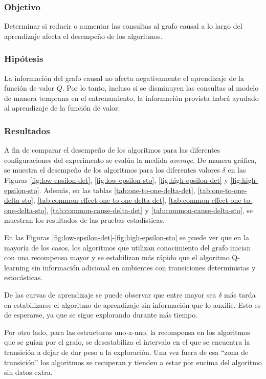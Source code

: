 \subsubsection{Objetivo}

Determinar si reducir o aumentar las consultas al grafo causal a lo largo del aprendizaje afecta el desempeño
de los algoritmos.

\subsubsection{Hipótesis}

La información del grafo causal no afecta negativamente 
el aprendizaje de la función de valor $Q$. Por lo tanto, incluso si se disminuyen las consultas al modelo de manera temprana en el entrenamiento, la información provista habrá
ayudado al aprendizaje de la función de valor.

\subsubsection{Resultados}

A fin de  comparar el desempeño de los algoritmos
para las diferentes configuraciones del experimento
se evalúa la medida \textit{average}.
De manera gráfica, se muestra el desempeño de los algoritmos
para los diferentes valores $\delta$ en las Figuras \ref{fig:low-epsilon-det}, \ref{fig:low-epsilon-sto}, \ref{fig:high-epsilon-det} y \ref{fig:high-epsilon-sto}.
Además, en las tablas \ref{tab:one-to-one-delta-det}, \ref{tab:one-to-one-delta-sto}, \ref{tab:common-effect-one-to-one-delta-det}, \ref{tab:common-effect-one-to-one-delta-sto},
\ref{tab:common-cause-delta-det} y \ref{tab:common-cause-delta-sto}, se muestran los resultados de las pruebas estadísticas.



En las Figuras \ref{fig:low-epsilon-det}-\ref{fig:high-epsilon-sto} se puede ver que en la mayoría de los casos, los algoritmos que utilizan conocimiento del grafo inician con una recompensa mayor y se estabilizan más rápido que el algoritmo Q-learning
sin información adicional en ambientes con transiciones deterministas y estocásticas.

De las curvas de aprendizaje se puede observar que 
entre mayor sea $\delta$ más tarda en estabilizarse
el algoritmo de aprendizaje sin información que lo auxilie. Esto es de esperarse, ya que se sigue explorando durante más tiempo. 

Por otro lado, para las estructuras uno-a-uno, la recompensa en los algoritmos que se guían por el grafo, se desestabiliza el intervalo en el que se encuentra la transición a dejar de dar peso a
la exploración. Una vez fuera de esa ``zona de transición'' los
algoritmos se recuperan y tienden a estar por encima del algoritmo sin datos extra.

